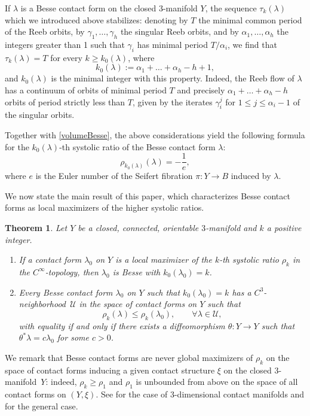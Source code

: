 \documentclass[10pt,a4paper]{amsart}
\newenvironment{enumeratei}
{\bgroup\def\theenumi{\roman{enumi}}\def\theenumii{\arabic{enumii}}\begin{enumerate}}
{\end{enumerate}\egroup}
\newtheorem{maintheorem}{Theorem}
\theoremstyle{definition}
\newcommand{\UU}{\mathcal{U}}
\let\eul e
\begin{document}
If $\lambda$ is a Besse contact form on the closed $3$-manifold $Y$, the sequence $\tau_k(\lambda)$ which we introduced above stabilizes: denoting by $T$ the minimal common period of the Reeb orbits, by $\gamma_1,\dots,\gamma_h$ the singular Reeb orbits, and by $\alpha_1,\dots,\alpha_h$ the integers greater than 1 such that $\gamma_i$ has minimal period $T/\alpha_i$, we find that $\tau_k(\lambda)=T$ for every $k\geq k_0(\lambda)$, where
\[
k_0(\lambda):= \alpha_1+\dots+\alpha_h - h + 1,
\]
and $k_0(\lambda)$ is the minimal integer with this property. Indeed, the Reeb flow of $\lambda$ has a continuum of orbits of minimal period $T$ and precisely $\alpha_1+\dots+\alpha_h - h$ orbits of period strictly less than $T$, given by the iterates $\gamma_i^j$ for $1\leq j \leq \alpha_i - 1$ of the singular orbits.

Together with \eqref{volumeBesse}, the above considerations yield the following formula for the $k_0(\lambda)$-th systolic ratio of the Besse contact form $\lambda$:
\[
\rho_{k_0(\lambda)} (\lambda) = - \frac{1}{\eul},
\]
where $\eul$ is the Euler number of the Seifert fibration $\pi:Y\to B$ induced by $\lambda$.

We now state the main result of this paper, which characterizes Besse contact forms as local maximizers of the higher systolic ratios.


\begin{maintheorem}
\label{t:main}
Let $Y$ be a closed, connected, orientable $3$-manifold and $k$ a positive integer.
\begin{enumeratei}
\item\label{t:maini}
 If a contact form $\lambda_0$ on $Y$ is a local maximizer of the $k$-th systolic ratio $\rho_k$ in the $C^{\infty}$-topology, then $\lambda_0$ is Besse with $k_0(\lambda_0)=k$.

\item\label{t:mainii}
Every Besse contact form $\lambda_0$ on $Y$ such that $k_0(\lambda_0)=k$ has a $C^3$-neighbor\-hood~$\UU$ in the space of contact forms on $Y$ such that
\[
\rho_k(\lambda) \leq \rho_k(\lambda_0), \qquad \forall \lambda\in \UU,
\]
with equality if and only if there exists a diffeomorphism $\theta:Y\to Y$ such that $\theta^*\lambda=c\lambda_0$ for some $c>0$.
\end{enumeratei}
\end{maintheorem}


We remark that Besse contact forms are never global maximizers of $\rho_k$ on the space of contact forms inducing a given contact structure $\xi$ on the closed $3$-manifold~$Y$: indeed, $\rho_k\geq \rho_1$ and $\rho_1$ is unbounded from above on the space of all contact forms on $(Y,\xi)$. See \cite{Abbondandolo:2019ta} for the case of 3-dimensional contact manifolds and \cite{Saglam:2018tb} for the general case.
\end{document}
